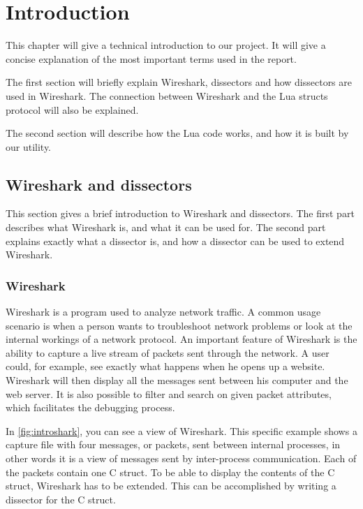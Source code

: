 \chapter*{Introduction}

This chapter will give a technical introduction to our project.
It will give a concise explanation of the most important terms used in the report.

The first section will briefly explain Wireshark, dissectors and how dissectors are used in Wireshark.
The connection between Wireshark and the Lua structs protocol will also be explained.

The second section will describe how the Lua code works, and how it is built by our utility.

\section*{Wireshark and dissectors}
This section gives a brief introduction to Wireshark and dissectors.
The first part describes what Wireshark is, and what it can be used for.
The second part explains exactly what a dissector is, and how a dissector can be used to extend Wireshark.

\subsection*{Wireshark}
Wireshark is a program used to analyze network traffic. A common usage scenario is when a person wants to troubleshoot network problems or
look at the internal workings of a network protocol. An important feature of Wireshark is the ability to capture a live stream of packets sent through the network. 
A user could, for example, see exactly what happens when he opens up a website. Wireshark will then display all the messages
sent between his computer and the web server. It is also possible to filter and search on given packet attributes, which facilitates the debugging process.

In \autoref{fig:introshark}, you can see a view of Wireshark.
This specific example shows a capture file with four messages, or packets, sent between internal processes, in other words
it is a view of messages sent by inter-process communication. Each of the packets contain one C struct.
To be able to display the contents of the C struct, Wireshark has to be extended. 
This can be accomplished by writing a dissector for the C struct.

